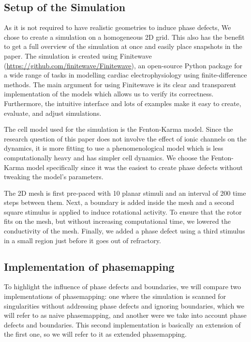 \documentclass[twocolumn]{article}
\begin{document}
\subsection{Setup of the Simulation}\label{setup-of-the-simulation}

As it is not required to have realistic geometries to induce phase
defects, We chose to create a simulation on a homogeneous 2D grid. This
also has the benefit to get a full overview of the simulation at once
and easily place snapshots in the paper.
The simulation is created using Finitewave
(\url{https://github.com/finitewave/Finitewave}), an open-source Python
package for a wide range of tasks in modelling cardiac electrophysiology
using finite-difference methods. The main argument for using Finitewave
is its clear and transparent implementation of the models which allows
us to verify its correctness. Furthermore, the intuitive interface and
lots of examples make it easy to create, evaluate, and adjust
simulations.

The cell model used for the simulation is the Fenton-Karma model. Since
the research question of this paper does not involve the effect of ionic
channels on the dynamics, it is more fitting to use a phenomenological
model which is less computationally heavy and has simpler cell dynamics.
We choose the Fenton-Karma model specifically since it was the easiest
to create phase defects without tweaking the model's parameters.

The 2D mesh is first pre-paced with 10 planar stimuli and an interval of
200 time steps between them. Next, a boundary is added inside the mesh
and a second square stimulus is applied to induce rotational activity.
To ensure that the rotor fits on the mesh, but without increasing
computational time, we lowered the conductivity of the mesh. Finally, we
added a phase defect using a third stimulus in a small region just
before it goes out of refractory.

\subsection{Implementation of
phasemapping}\label{implementation-of-phasemapping}

To highlight the influence of phase defects and boundaries, we will
compare two implementations of phasemapping: one where the simulation is
scanned for singularities without addressing phase defects and ignoring
boundaries, which we will refer to as naive phasemapping, and another
were we take into account phase defects and boundaries. This second
implementation is basically an extension of the first one, so we will
refer to it as extended phasemapping.
\end{document}
